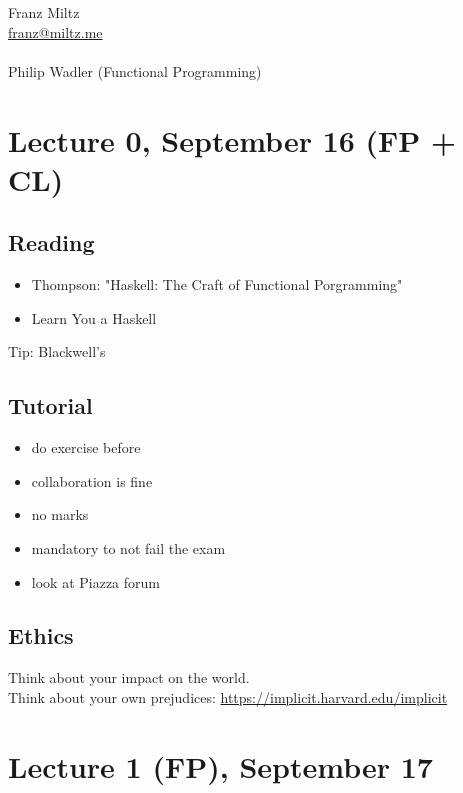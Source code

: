 \documentclass{article}
\begin{document}
\begin{titlepage}
    \begin{center}        
        \LARGE Franz Miltz\\
        
        \url{franz@miltz.me}\\
        \vspace{5cm}
        \LARGE{}\\
        \vspace{1cm}
        Philip Wadler (Functional Programming)
    \end{center}
\end{titlepage}
\tableofcontents
\pagebreak
\section{Lecture 0, September 16 (FP + CL)}
\subsection{Reading}
\begin{itemize}
    \item Thompson: "Haskell: The Craft of Functional Porgramming"
    \item Learn You a Haskell
\end{itemize}
Tip: Blackwell's\\
\subsection{Tutorial}
\begin{itemize}
    \item do exercise before
    \item collaboration is fine
    \item no marks
    \item mandatory to not fail the exam
\end{itemize}
\begin{itemize}
    \item look at Piazza forum
\end{itemize}
\subsection{Ethics}
Think about your impact on the world.\\
Think about your own prejudices:
\url{https://implicit.harvard.edu/implicit}
\section{Lecture 1 (FP), September 17}
\end{document}
